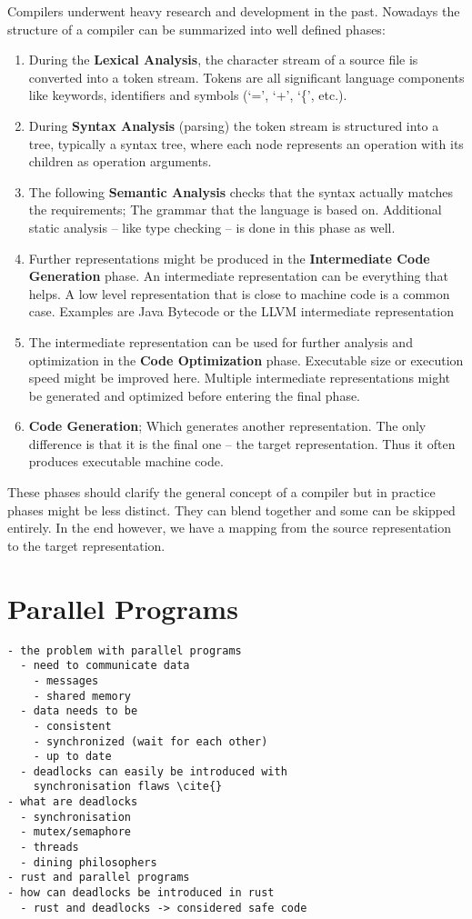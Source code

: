 Compilers underwent heavy research and development in the past.
Nowadays the structure of a compiler can be summarized into well defined phases\cite[Chapter 1.2]{aho1986compilers}:

\begin{enumerate}
  \item During the \textbf{Lexical Analysis}, the character stream of a source file is converted into a token stream.
  Tokens are all significant language components like keywords, identifiers and symbols (`=', `+', `\{', etc.).
  \item During \textbf{Syntax Analysis} (parsing) the token stream is structured into a tree,
  typically a syntax tree, where each node represents an operation with its children as operation arguments.
  \item The following \textbf{Semantic Analysis} checks that the syntax actually matches the requirements;
  The grammar that the language is based on.\newline
  Additional static analysis -- like type checking -- is done in this phase as well.
  \item Further representations might be produced in the \textbf{Intermediate Code Generation} phase.
  An intermediate representation can be everything that helps.
  A low level representation that is close to machine code is a common case.
  Examples are Java Bytecode or the LLVM intermediate representation
  \item The intermediate representation can be used for further analysis and optimization in the \textbf{Code Optimization} phase.
  Executable size or execution speed might be improved here.
  Multiple intermediate representations might be generated and optimized before entering the final phase.
  \item \textbf{Code Generation};
  Which generates another representation.
  The only difference is that it is the final one -- the target representation.
  Thus it often produces executable machine code.
\end{enumerate}

These phases should clarify the general concept of a compiler but in practice phases might be less distinct.
They can blend together and some can be skipped entirely.
In the end however, we have a mapping from the source representation to the target representation.

\section{Parallel Programs}
\label{rel_para}
\begin{verbatim}
- the problem with parallel programs
  - need to communicate data
    - messages
    - shared memory
  - data needs to be 
    - consistent 
    - synchronized (wait for each other)
    - up to date
  - deadlocks can easily be introduced with 
    synchronisation flaws \cite{}
- what are deadlocks
  - synchronisation
  - mutex/semaphore
  - threads
  - dining philosophers
- rust and parallel programs
- how can deadlocks be introduced in rust
  - rust and deadlocks -> considered safe code
\end{verbatim}

